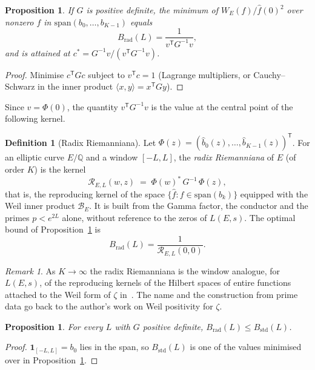 \documentclass[11pt]{amsart}
\newtheorem{proposition}[theorem]{Proposition}
\theoremstyle{remark}
\newtheorem{remark}[theorem]{Remark}
\theoremstyle{definition}
\newtheorem{definition}[theorem]{Definition}
\newcommand{\Q}{\mathbb{Q}}
\begin{document}
\begin{proposition}\label{prop:opt}
If $G$ is positive definite, the minimum of $W_E(f)/\hat f(0)^2$ over nonzero $f$ in $\mathrm{span}(b_0,\dots,b_{K-1})$ equals
\[
B_{\mathrm{rad}}(L)=\frac{1}{v^{\mathsf T}G^{-1}v},
\]
and is attained at $c^\ast=G^{-1}v/(v^{\mathsf T}G^{-1}v)$.
\end{proposition}
\begin{proof}
Minimise $c^{\mathsf T}Gc$ subject to $v^{\mathsf T}c=1$ (Lagrange multipliers, or Cauchy--Schwarz in the inner product $\langle x,y\rangle=x^{\mathsf T}Gy$).
\end{proof}

Since $v=\Phi(0)$, the quantity $v^{\mathsf T}G^{-1}v$ is the value at the central point of the following kernel.

\begin{definition}[Radix Riemanniana]\label{def:radix}
Let $\Phi(z)=(\hat b_0(z),\dots,\hat b_{K-1}(z))^{\mathsf T}$. For an elliptic curve $E/\Q$ and a window $[-L,L]$, the \emph{radix Riemanniana} of $E$ (of order $K$) is the kernel
\[
\mathcal R_{E,L}(w,z)\;=\;\Phi(w)^{\ast}\,G^{-1}\,\Phi(z),
\]
that is, the reproducing kernel of the space $\{\hat f: f\in\mathrm{span}(b_k)\}$ equipped with the Weil inner product $\mathcal B_E$. It is built from the Gamma factor, the conductor and the primes $p<e^{2L}$ alone, without reference to the zeros of $L(E,s)$. The optimal bound of Proposition~\ref{prop:opt} is
\[
B_{\mathrm{rad}}(L)=\frac{1}{\mathcal R_{E,L}(0,0)}.
\]
\end{definition}

\begin{remark}
As $K\to\infty$ the radix Riemanniana is the window analogue, for $L(E,s)$, of the reproducing kernels of the Hilbert spaces of entire functions attached to the Weil form of $\zeta$ in~\cite{Suzuki}. The name and the construction from prime data go back to the author's work on Weil positivity for $\zeta$.
\end{remark}

\begin{proposition}\label{prop:dominate}
For every $L$ with $G$ positive definite, $B_{\mathrm{rad}}(L)\le B_{\mathrm{std}}(L)$.
\end{proposition}
\begin{proof}
$\mathbf 1_{[-L,L]}=b_0$ lies in the span, so $B_{\mathrm{std}}(L)$ is one of the values minimised over in Proposition~\ref{prop:opt}.
\end{proof}
\end{document}
